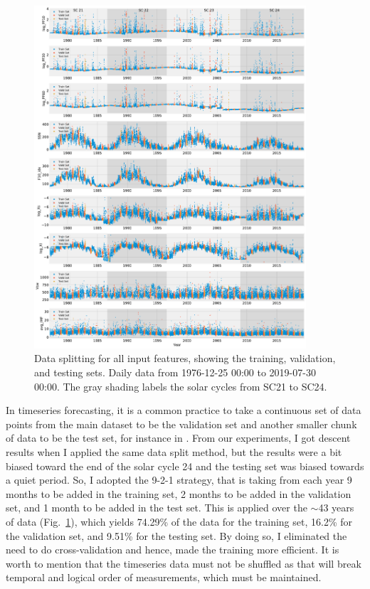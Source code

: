 \begin{figure}[h!]
	\centering
    \includegraphics[width=0.9\textwidth]{chapter4/figs/subplots_dataSplit_allFeatures.pdf}
    \caption{Data splitting for all input features, showing the training, validation, and testing sets. Daily data from 1976-12-25 00:00 to 2019-07-30 00:00. The gray shading labels the solar cycles from SC21 to SC24.}
\label{fig_allFeatures}
\end{figure}

In timeseries forecasting, it is a common practice to take a continuous set of data points from the main dataset to be the validation set and another smaller chunk of data to be the test set, for instance in \citet{pala_2019, benson_2020, zhang_2022, zhu_2022}. 
From our experiments, I got descent results when I applied the same data split method, but the results were a bit biased toward the end of the solar cycle 24 and the testing set was biased towards a quiet period. So, I adopted the 9-2-1 strategy, that is taking from each year 9 months to be added in the training set, 2 months to be added in the validation set, and 1 month to be added in the test set. This is applied over the $\sim$43 years of data (Fig.~\ref{fig_allFeatures}), which yields 74.29\% of the data for the training set, 16.2\% for the validation set, and 9.51\% for the testing set. By doing so, I eliminated the need to do cross-validation and hence, made the training more efficient.
It is worth to mention that the timeseries data must not be shuffled as that will break temporal and logical order of measurements, which must be maintained.

